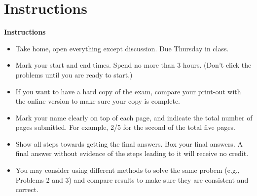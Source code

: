 \documentclass{article}
\begin{document}
\begin{comment}
\begin{tabular}{l}
.  \\
.  \\
.  \\
\end{tabular}
\vskip 5cm

\item {\bf What did not go well for your learning in the course? Be specific.}
\begin{tabular}{l}
.  \\
.  \\
.  \\
\end{tabular}
\vskip 0.9in

\item {\bf Indicate one thing you want to improve and how.}
\begin{tabular}{l}
.  \\
.  \\
.  \\
\end{tabular}
\vskip 0.9in

\end{itemize}

\end{itemize}
\end{comment}


\section*{Instructions}

{\bf Instructions}
\begin{itemize}
\item Take home, open everything except discussion. Due Thursday in class.
\item Mark your start and end times. Spend no more than 3 hours.
  (Don't click the problems until you are ready to start.)
\item If you want to have a hard copy of the exam, compare your print-out
  with the online version to make sure your copy is complete.
\item Mark your name clearly on top of each page, and indicate the total
  number of pages submitted. For example, 2/5 for the second of the total 
  five pages.
\item Show all steps towards getting the final answers. Box your final 
  answers. A final answer without evidence of the steps leading to it 
  will receive no credit.
\item You may consider using different methods to solve the same probem 
  (e.g., Problems 2 and 3) and compare results to make sure they are 
  consistent and correct.
\end{itemize}
\end{document}
